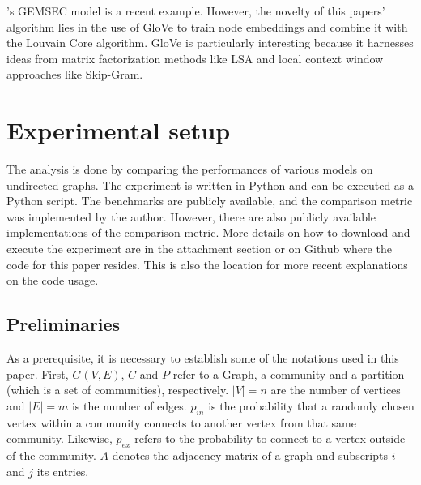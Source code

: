 \documentclass[11pt, twocolumn]{article}
\begin{document}
\citeauthor{rozemberczki_GEMSECGraphEmbedding_2019}'s GEMSEC model is a recent example.\cite{rozemberczki_GEMSECGraphEmbedding_2019} However, the novelty of this papers' algorithm lies in the use of GloVe to train node embeddings and combine it with the Louvain Core algorithm.\cite{pennington_GloveGlobalVectors_2014} GloVe is particularly interesting because it harnesses ideas from matrix factorization methods like LSA and local context window approaches like Skip-Gram.  

\section{Experimental setup}
\label{sec:experiment}
The analysis is done by comparing the performances of various models on undirected graphs. The experiment is written in Python and can be executed as a Python script. The benchmarks are publicly available, and the comparison metric was implemented by the author. However, there are also publicly available implementations of the comparison metric. More details on how to download and execute the experiment are in the attachment section or on Github where the code for this paper resides. This is also the location for more recent explanations on the code usage.

\subsection{Preliminaries}
As a prerequisite, it is necessary to establish some of the notations used in this paper. First, $G(V, E)$, $C$ and $P$ refer to a Graph, a community and a partition (which is a set of communities), respectively. $|V|= n$ are the number of vertices and $|E|=m$ is the number of edges. $p_{in}$ is the probability that a randomly chosen vertex within a community connects to another vertex from that same community. Likewise, $p_{ex}$ refers to the probability to connect to a vertex outside of the community. $A$ denotes the adjacency matrix of a graph and subscripts $i$ and $j$ its entries.
\end{document}
